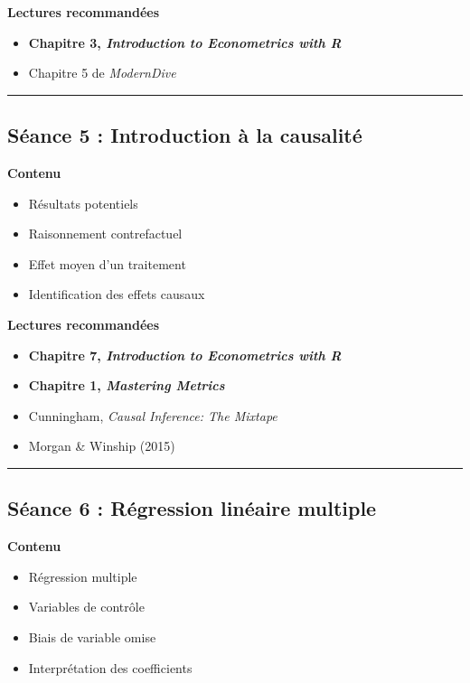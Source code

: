 \documentclass[
  11pt,
]{article}
\providecommand{\tightlist}{%
  \setlength{\itemsep}{0pt}\setlength{\parskip}{0pt}}
\begin{document}
\textbf{Lectures recommandées}

\begin{itemize}
\tightlist
\item
  \textbf{Chapitre 3, \emph{Introduction to Econometrics with R}}
\item
  Chapitre 5 de \emph{ModernDive}
\end{itemize}

\begin{center}\rule{0.5\linewidth}{0.5pt}\end{center}

\subsection{Séance 5 : Introduction à la
causalité}\label{suxe9ance-5-introduction-uxe0-la-causalituxe9}

\textbf{Contenu}

\begin{itemize}
\tightlist
\item
  Résultats potentiels
\item
  Raisonnement contrefactuel
\item
  Effet moyen d'un traitement
\item
  Identification des effets causaux
\end{itemize}

\textbf{Lectures recommandées}

\begin{itemize}
\tightlist
\item
  \textbf{Chapitre 7, \emph{Introduction to Econometrics with R}}
\item
  \textbf{Chapitre 1, \emph{Mastering Metrics}}
\item
  Cunningham, \emph{Causal Inference: The Mixtape}
\item
  Morgan \& Winship (2015)
\end{itemize}

\begin{center}\rule{0.5\linewidth}{0.5pt}\end{center}

\subsection{Séance 6 : Régression linéaire
multiple}\label{suxe9ance-6-ruxe9gression-linuxe9aire-multiple}

\textbf{Contenu}

\begin{itemize}
\tightlist
\item
  Régression multiple
\item
  Variables de contrôle
\item
  Biais de variable omise
\item
  Interprétation des coefficients
\end{itemize}
\end{document}
